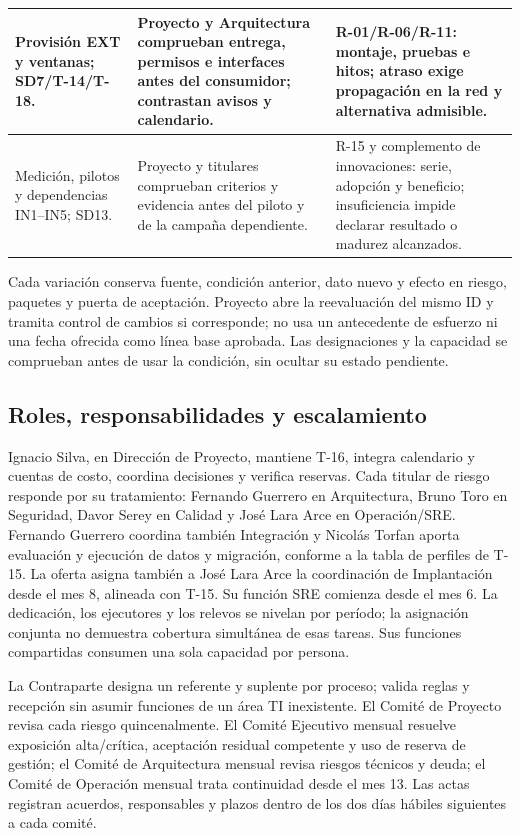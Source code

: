 \begin{longtable}{L{\dimexpr.25\tabcolsep\relax}L{\dimexpr.37\tabcolsep\relax}L{\dimexpr.38\tabcolsep\relax}}
Provisión EXT y ventanas; SD7/T-14/T-18. & Proyecto y Arquitectura comprueban entrega, permisos e interfaces antes del consumidor; contrastan avisos y calendario. & R-01/R-06/R-11: montaje, pruebas e hitos; atraso exige propagación en la red y alternativa admisible.\\\hline
Medición, pilotos y dependencias IN1--IN5; SD13. & Proyecto y titulares comprueban criterios y evidencia antes del piloto y de la campaña dependiente. & R-15 y complemento de innovaciones: serie, adopción y beneficio; insuficiencia impide declarar resultado o madurez alcanzados.\\\hline
\end{longtable}\endgroup
{}
Cada variación conserva fuente, condición anterior, dato nuevo y efecto en riesgo, paquetes y puerta de aceptación. Proyecto abre la reevaluación del mismo ID y tramita control de cambios si corresponde; no usa un antecedente de esfuerzo ni una fecha ofrecida como línea base aprobada. Las designaciones y la capacidad se comprueban antes de usar la condición, sin ocultar su estado pendiente.

\subsection{Roles, responsabilidades y escalamiento}
Ignacio Silva, en Dirección de Proyecto, mantiene T-16, integra calendario y cuentas de costo, coordina decisiones y verifica reservas. Cada titular de riesgo responde por su tratamiento: Fernando Guerrero en Arquitectura, Bruno Toro en Seguridad, Davor Serey en Calidad y José Lara Arce en Operación/SRE. Fernando Guerrero coordina también Integración y Nicolás Torfan aporta evaluación y ejecución de datos y migración, conforme a la tabla de perfiles de T-15. La oferta asigna también a José Lara Arce la coordinación de Implantación desde el mes 8, alineada con T-15. Su función SRE comienza desde el mes 6. La dedicación, los ejecutores y los relevos se nivelan por período; la asignación conjunta no demuestra cobertura simultánea de esas tareas. Sus funciones compartidas consumen una sola capacidad por persona.

La Contraparte designa un referente y suplente por proceso; valida reglas y recepción sin asumir funciones de un área TI inexistente. El Comité de Proyecto revisa cada riesgo quincenalmente. El Comité Ejecutivo mensual resuelve exposición alta/crítica, aceptación residual competente y uso de reserva de gestión; el Comité de Arquitectura mensual revisa riesgos técnicos y deuda; el Comité de Operación mensual trata continuidad desde el mes 13. Las actas registran acuerdos, responsables y plazos dentro de los dos días hábiles siguientes a cada comité. \parencites[art.~71, pp.~37--38]{sd8-ba}[RT-19.04/09, pp.~33--34]{sd8-bt}[cap.~10, restricción 7, p.~26; numeral 13.3, pp.~29--30]{sd8-c07}

